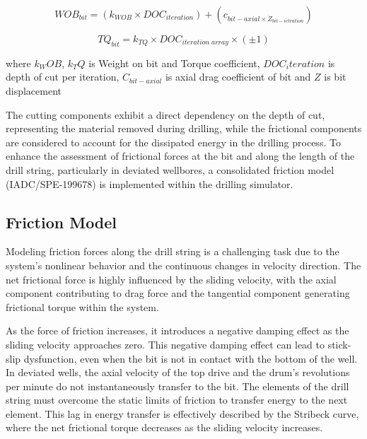 \begin{equation}\label{WOB}
  WOB_{bit} = (k_{WOB}\times DOC_{iteration}) + (c_{bit-axial\times \dot{Z}_{bit-ietration}})
\end{equation}

\begin{equation}\label{Torque}
  TQ_{bit} = k_{TQ}\times DOC_{iteration\; array}\times (\pm1)
\end{equation}

where $k_WOB$, $k_TQ$ is Weight on bit and Torque coefficient, $DOC_iteration$ is depth of cut per iteration, $C_{bit-axial}$ is axial drag coefficient of bit and $Z$ is bit displacement 

The cutting components exhibit a direct dependency on the depth of cut, representing the material removed during drilling, while the frictional components are considered to account for the dissipated energy in the drilling process. To enhance the assessment of frictional forces at the bit and along the length of the drill string, particularly in deviated wellbores, a consolidated friction model (IADC/SPE-199678) is implemented within the drilling simulator. 


\subsection{Friction Model}

Modeling friction forces along the drill string is a challenging task due to the system's nonlinear behavior and the continuous changes in velocity direction. The net frictional force is highly influenced by the sliding velocity, with the axial component contributing to drag force and the tangential component generating frictional torque within the system.
 

As the force of friction increases, it introduces a negative damping effect as the sliding velocity approaches zero. This negative damping effect can lead to stick-slip dysfunction, even when the bit is not in contact with the bottom of the well. In deviated wells, the axial velocity of the top drive and the drum's revolutions per minute do not instantaneously transfer to the bit. The elements of the drill string must overcome the static limits of friction to transfer energy to the next element. This lag in energy transfer is effectively described by the Stribeck curve, where the net frictional torque decreases as the sliding velocity increases.

